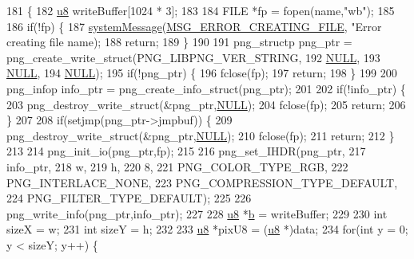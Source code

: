 \begin{DoxyCode}
181 \{
182   \mbox{\hyperlink{_system_8h_aed742c436da53c1080638ce6ef7d13de}{u8}} writeBuffer[1024 * 3];
183   
184   FILE *fp = fopen(name,\textcolor{stringliteral}{"wb"});
185 
186   \textcolor{keywordflow}{if}(!fp) \{
187     \mbox{\hyperlink{system_8cpp_a747a9cb8e015a3d45cca636b5bd0fc69}{systemMessage}}(\mbox{\hyperlink{_n_l_s_8h_a165f1f2539e202f0a24e6e9583c63475}{MSG\_ERROR\_CREATING\_FILE}}, \textcolor{stringliteral}{"Error creating file %
      name);
188     \textcolor{keywordflow}{return};
189   \}
190   
191   png\_structp png\_ptr = png\_create\_write\_struct(PNG\_LIBPNG\_VER\_STRING,
192                                                 \mbox{\hyperlink{getopt1_8c_a070d2ce7b6bb7e5c05602aa8c308d0c4}{NULL}},
193                                                 \mbox{\hyperlink{getopt1_8c_a070d2ce7b6bb7e5c05602aa8c308d0c4}{NULL}},
194                                                 \mbox{\hyperlink{getopt1_8c_a070d2ce7b6bb7e5c05602aa8c308d0c4}{NULL}});
195   \textcolor{keywordflow}{if}(!png\_ptr) \{
196     fclose(fp);
197     \textcolor{keywordflow}{return};
198   \}
199 
200   png\_infop info\_ptr = png\_create\_info\_struct(png\_ptr);
201 
202   \textcolor{keywordflow}{if}(!info\_ptr) \{
203     png\_destroy\_write\_struct(&png\_ptr,\mbox{\hyperlink{getopt1_8c_a070d2ce7b6bb7e5c05602aa8c308d0c4}{NULL}});
204     fclose(fp);
205     \textcolor{keywordflow}{return};
206   \}
207 
208   \textcolor{keywordflow}{if}(setjmp(png\_ptr->jmpbuf)) \{
209     png\_destroy\_write\_struct(&png\_ptr,\mbox{\hyperlink{getopt1_8c_a070d2ce7b6bb7e5c05602aa8c308d0c4}{NULL}});
210     fclose(fp);
211     \textcolor{keywordflow}{return};
212   \}
213 
214   png\_init\_io(png\_ptr,fp);
215 
216   png\_set\_IHDR(png\_ptr,
217                info\_ptr,
218                w,
219                h,
220                8,
221                PNG\_COLOR\_TYPE\_RGB,
222                PNG\_INTERLACE\_NONE,
223                PNG\_COMPRESSION\_TYPE\_DEFAULT,
224                PNG\_FILTER\_TYPE\_DEFAULT);
225 
226   png\_write\_info(png\_ptr,info\_ptr);
227 
228   \mbox{\hyperlink{_system_8h_aed742c436da53c1080638ce6ef7d13de}{u8}} *\mbox{\hyperlink{expr-lex_8cpp_a91b64995742fd30063314f12340b4b5a}{b}} = writeBuffer;
229 
230   \textcolor{keywordtype}{int} sizeX = w;
231   \textcolor{keywordtype}{int} sizeY = h;
232 
233   \mbox{\hyperlink{_system_8h_aed742c436da53c1080638ce6ef7d13de}{u8}} *pixU8 = (\mbox{\hyperlink{_system_8h_aed742c436da53c1080638ce6ef7d13de}{u8}} *)data;
234   \textcolor{keywordflow}{for}(\textcolor{keywordtype}{int} y = 0; y < sizeY; y++) \{
}
\end{DoxyCode}
